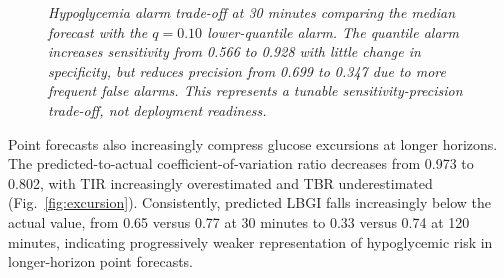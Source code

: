 \documentclass[journal]{IEEEtran}
\begin{document}
\begin{figure}[t]
\centering
{}
\caption{\small\textit {Hypoglycemia alarm trade-off at 30 minutes comparing the median forecast with the $q=0.10$ lower-quantile alarm. The quantile alarm increases sensitivity from 0.566 to 0.928 with little change in specificity, but reduces precision from 0.699 to 0.347 due to more frequent false alarms. This represents a tunable sensitivity-precision trade-off, not deployment readiness.}}
\label{fig:hypo}
\end{figure}


Point forecasts also increasingly compress glucose excursions at longer horizons. The predicted-to-actual coefficient-of-variation ratio decreases from 0.973 to 0.802, with TIR increasingly overestimated and TBR underestimated (Fig.~\ref{fig:excursion}). Consistently, predicted LBGI falls increasingly below the actual value, from 0.65 versus 0.77 at 30 minutes to 0.33 versus 0.74 at 120 minutes, indicating progressively weaker representation of hypoglycemic risk in longer-horizon point forecasts.
\end{document}
